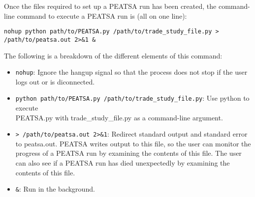 
Once the files required to set up a PEATSA run has been created, the command-line command to execute a PEATSA run is (all on one line):

\setlength\parindent{-15pt} \verb|nohup python path/to/PEATSA.py /path/to/trade_study_file.py > /path/to/peatsa.out 2>&1 &|

\noindent The following is a breakdown of the different elements of this command:

\begin{itemize}
	\item \verb|nohup|: Ignore the hangup signal so that the process does not stop if the user logs out or is diconnected.
	\item \verb|python path/to/PEATSA.py /path/to/trade_study_file.py|: Use python to execute \\ PEATSA.py with trade\_study\_file.py as a command-line argument.
	\item \verb|> /path/to/peatsa.out 2>&1|: Redirect standard output and standard error to peatsa.out. \ac{PEATSA} writes output to this file, so the user can monitor the progress of a \ac{PEATSA} run by examining the contents of this file. The user can also see if a \ac{PEATSA} run has died unexpectedly by examining the contents of this file.
	\item \verb|&|: Run in the background.
\end{itemize}